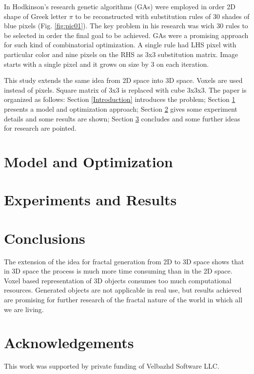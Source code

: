 \documentclass{llncs}
\begin{document}
In Hodkinson's research genetic algorithms (GAs) were employed in order 2D shape of Greek letter $\pi$ to be reconstructed with substitution rules of 30 shades of blue pixels (Fig. \ref{fig:pic01}). The key problem in his research was wich 30 rules to be selected in order the final goal to be achieved. GAs were a promising approach for such kind of combinatorial optimization. A single rule had LHS pixel with particular color and nine pixels on the RHS as 3x3 substitution matrix. Image starts with a single pixel and it grows on size by 3 on each iteration. 

This study extends the same idea from 2D space into 3D space. Voxels are used instead of pixels. Square matrix of 3x3 is replaced with cube 3x3x3. The paper is organized as follows: Section \ref{Introduction} introduces the problem; Section \ref{Model and Optimization} presents a model and optimization approach; Section \ref{Experiments and Results} gives some experiment details and some results are shown; Section \ref{Conclusions} concludes and some further ideas for research are pointed.

\section{Model and Optimization} \label{Model and Optimization}

\section{Experiments and Results} \label{Experiments and Results}

\section{Conclusions} \label{Conclusions}

The extension of the idea for fractal generation from 2D to 3D space shows that in 3D space the process is much more time consuming than in the 2D space. Voxel based representation of 3D objects consumes too much computational resources. Generated objects are not applicable in real use, but results achieved are promising for further research of the fractal nature of the world in which all we are living. 

\section*{Acknowledgements}
This work was supported by private funding of Velbazhd Software LLC.
\end{document}

